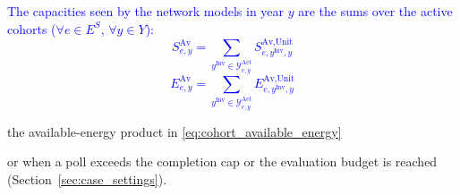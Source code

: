 \textcolor{blue}{
    The capacities seen by the network models in year $y$ are the sums over the active cohorts ($\forall e \in E^S$, $\forall y \in Y$):
}
\textcolor{blue}{
    \begin{equation}
        S^{\text{Av}}_{e,y} = \sum_{y^{\text{Inv}}\in\mathcal{Y}^{\text{Act}}_{e,y}} S^{\text{Av,Unit}}_{e,y^{\text{Inv}},y}
        \label{eq:available_power}
    \end{equation}
    \begin{equation}
        E^{\text{Av}}_{e,y} = \sum_{y^{\text{Inv}}\in\mathcal{Y}^{\text{Act}}_{e,y}} E^{\text{Av,Unit}}_{e,y^{\text{Inv}},y}
        \label{eq:available_capacity}
    \end{equation}
}

    the available-energy product in \eqref{eq:cohort_available_energy}

    or when a poll exceeds the completion cap or the evaluation budget is reached (Section~\ref{sec:case_settings}).

